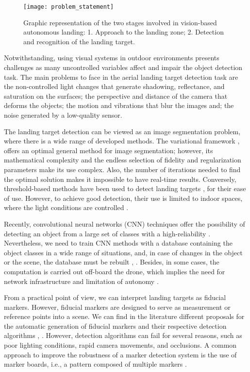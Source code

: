 \begin{figure}[!ht]
    \centering
    \texttt{[image: problem\_statement]}        
    \caption{Graphic representation of the two stages involved in vision-based autonomous landing: 1. Approach to the landing zone; 2. Detection and recognition of the landing target.}\label{fig:visionbased_landing_problem_sketch}
\end{figure}

Notwithstanding, using visual systems in outdoor environments presents challenges as many uncontrolled variables affect and impair the object detection task. The main problems to face in the aerial landing target detection task are the non-controlled light changes that generate shadowing, reflectance, and saturation on the surfaces; the perspective and distance of the camera that deforms the objects; the motion and vibrations that blur the images and; the noise generated by a low-quality sensor.

The landing target detection can be viewed as an image segmentation problem, where there is a wide range of developed methods. The variational framework \citep{Mumford.Shah:CPAM:1989}, offers an optimal general method for image segmentation; however, its mathematical complexity and the endless selection of fidelity and regularization parameters make its use complex. Also, the number of iterations needed to find the optimal solution makes it impossible to have real-time results. Conversely, threshold-based methods have been used to detect landing targets \citep{Lacroix.Caballero:IROS:2006}, \citep{Lange.Sunderhauf.ea:SIMPAR:2008} for their ease of use. However, to achieve good detection, their use is limited to indoor spaces, where the light conditions are controlled \citep{Araar.Aouf.ea:IROS:2017}. 

Recently, convolutional neural networks (CNN) techniques offer the possibility of detecting an object from a large set of classes with a high-reliability \citep{Carrio.Sampedro.ea:JS:2017}. Nevertheless, we need to train CNN methods with a database containing the object classes in a wide range of situations, and, in case of changes in the object or the scene, the database must be rebuilt \citep{Yao.Yu.ea:CCC:2017}, \citep{Furukawa:TechRep:2018}. Besides, in some cases, the computation is carried out off-board the drone, which implies the need for network infrastructure and limitation of autonomy \citep{Lee.Wang.ea:IRC:2017}.

From a practical point of view, we can interpret landing targets as fiducial markers. However, fiducial markers are designed to serve as measurement or reference points into a scene. We can find in the literature different proposals for the automatic generation of fiducial markers and their respective detection algorithms \citep{Fiala:PAMI:2010}, \citep{Naimark.Foxlin:ISMAR:2002}. However, detection algorithms can fail for several reasons, such as poor lighting conditions, rapid camera movements, and occlusions. A common approach to improve the robustness of a marker detection system is the use of marker boards, i.e., a pattern composed of multiple markers \citep{Garrido-Jurado.Munoz-Salinas.ea:PR:2014}. 

